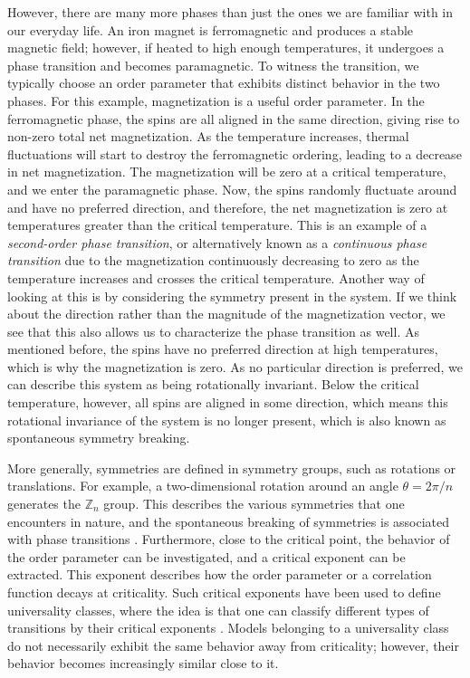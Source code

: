 However, there are many more phases than just the ones we are familiar with in our everyday life. An iron magnet is ferromagnetic and produces a stable magnetic field; however, if heated to high enough temperatures, it undergoes a phase transition and becomes paramagnetic. To witness the transition, we typically choose an order parameter that exhibits distinct behavior in the two phases. For this example, magnetization is a useful order parameter. In the ferromagnetic phase, the spins are all aligned in the same direction, giving rise to non-zero total net magnetization. As the temperature increases, thermal fluctuations will start to destroy the ferromagnetic ordering, leading to a decrease in net magnetization. The magnetization will be zero at a critical temperature, and we enter the paramagnetic phase. Now, the spins randomly fluctuate around and have no preferred direction, and therefore, the net magnetization is zero at temperatures greater than the critical temperature. This is an example of a \textit{second-order phase transition}, or alternatively known as a \textit{continuous phase transition} due to the magnetization continuously decreasing to zero as the temperature increases and crosses the critical temperature. Another way of looking at this is by considering the symmetry present in the system. If we think about the direction rather than the magnitude of the magnetization vector, we see that this also allows us to characterize the phase transition as well. As mentioned before, the spins have no preferred direction at high temperatures, which is why the magnetization is zero. As no particular direction is preferred, we can describe this system as being rotationally invariant. Below the critical temperature, however, all spins are aligned in some direction, which means this rotational invariance of the system is no longer present, which is also known as spontaneous symmetry breaking.

More generally, symmetries are defined in symmetry groups, such as rotations or translations. For example, a two-dimensional rotation around an angle $\theta = 2 \pi/n$ generates the $\mathbb{Z}_n$ group. This describes the various symmetries that one encounters in nature, and the spontaneous breaking of symmetries is associated with phase transitions \cite{sachdev2011}. Furthermore, close to the critical point, the behavior of the order parameter can be investigated, and a critical exponent can be extracted. This exponent describes how the order parameter or a correlation function decays at criticality. Such critical exponents have been used to define universality classes, where the idea is that one can classify different types of transitions by their critical exponents \cite{odor2004}. Models belonging to a universality class do not necessarily exhibit the same behavior away from criticality; however, their behavior becomes increasingly similar close to it. 

